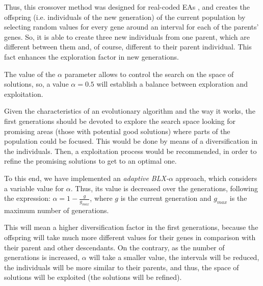 \documentclass[10pt,journal,compsoc]{IEEEtran}
\begin{document}

Thus, this crossover method was designed for real-coded EAs \cite{blx2008}, and creates the offspring (i.e. individuals of the new generation) of the current population by selecting random values for every gene around an interval for each of the parents' genes. So, it is able to create three new individuals from one parent, which are different between them and, of course, different to their parent individual. This fact enhances the exploration factor in new generations.

The value of the $\alpha$ parameter allows to control the search on the space of solutions, so, a value $\alpha = 0.5$ will establish a balance between exploration and exploitation.

Given the characteristics of an evolutionary algorithm and the way it works, the first generations should be devoted to explore the search space looking for promising areas (those with potential good solutions) where parts of the population could be focused. This would be done by means of a diversification in the individuals. Then, a exploitation process would be recommended, in order to refine the promising solutions to get to an optimal one.

To this end, we have implemented an \textit{adaptive BLX-$\alpha$}
approach, which considers a variable value for $\alpha$. Thus, its
value is decreased over the generations, following
the expression: $\alpha =1-\frac{g}{g_{max}}$, where $g$ is the
current generation and $g_{max}$ is the maximum number of generations.

This will mean a higher diversification factor in the first generations, because the offspring will take much more different values for their genes in comparison with their parent and other descendants. %
On the contrary, as the number of generations is increased, $\alpha$ will take a smaller value, the intervals will be reduced, the individuals will be more similar to their parents, and thus, the space of solutions will be exploited (the solutions will be refined).
\end{document}
